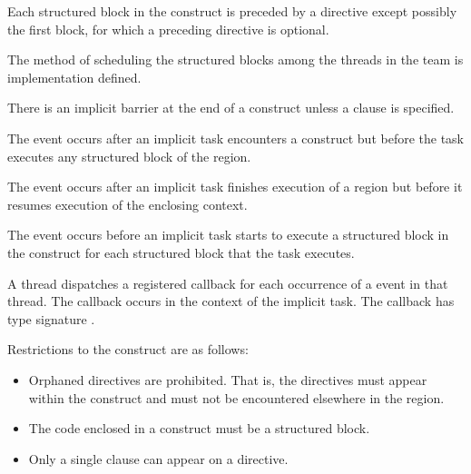 \descr
Each structured block in the  construct is preceded by a 
 directive except possibly the first block, for which a preceding 
 directive is optional.

The method of scheduling the structured blocks among the threads in the team is
implementation defined.

There is an implicit barrier at the end of a  construct unless a 
 clause is specified.

\events

The  event occurs after an implicit task encounters a
 construct but before the task executes any 
structured block of the  region.

The  event occurs after an implicit task finishes execution 
of a  region but before it resumes execution of the enclosing context.

The  event occurs before an implicit task starts
to execute a structured block in the  construct for
each structured block that the task executes.


A thread dispatches a registered 
callback for each occurrence of a  
event in that thread. The callback occurs in the
context of the implicit task.  The callback has type signature
. 

\restrictions
Restrictions to the  construct are as follows:

\begin{itemize}
\item Orphaned  directives are prohibited. That is, the 
       directives must appear within the  
      construct and must not be encountered elsewhere in the  region.
\item The code enclosed in a  construct must be a structured block.
\item Only a single  clause can appear on a  directive.

\end{itemize}

